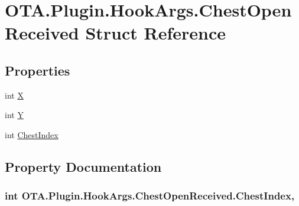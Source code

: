 \hypertarget{struct_o_t_a_1_1_plugin_1_1_hook_args_1_1_chest_open_received}{}\section{O\+T\+A.\+Plugin.\+Hook\+Args.\+Chest\+Open\+Received Struct Reference}
\label{struct_o_t_a_1_1_plugin_1_1_hook_args_1_1_chest_open_received}
\subsection*{Properties}
\begin{DoxyCompactItemize}
\item 
int \hyperlink{struct_o_t_a_1_1_plugin_1_1_hook_args_1_1_chest_open_received_ac4d2ea25bf6f8a10874189d8e78912d9}{X}
\item 
int \hyperlink{struct_o_t_a_1_1_plugin_1_1_hook_args_1_1_chest_open_received_acf257ce983bdcf5049a55a621ef19f12}{Y}
\item 
int \hyperlink{struct_o_t_a_1_1_plugin_1_1_hook_args_1_1_chest_open_received_ac6c47bdf310c68f0464058dda63289ed}{Chest\+Index}
\end{DoxyCompactItemize}


\subsection{Property Documentation}
\hypertarget{struct_o_t_a_1_1_plugin_1_1_hook_args_1_1_chest_open_received_ac6c47bdf310c68f0464058dda63289ed}{}
\subsubsection[{Chest\+Index}]{\setlength{\rightskip}{0pt plus 5cm}int O\+T\+A.\+Plugin.\+Hook\+Args.\+Chest\+Open\+Received.\+Chest\+Index\hspace{0.3cm}{\ttfamily [get]}, {\ttfamily [set]}}\label{struct_o_t_a_1_1_plugin_1_1_hook_args_1_1_chest_open_received_ac6c47bdf310c68f0464058dda63289ed}
\hypertarget{struct_o_t_a_1_1_plugin_1_1_hook_args_1_1_chest_open_received_ac4d2ea25bf6f8a10874189d8e78912d9}{}
